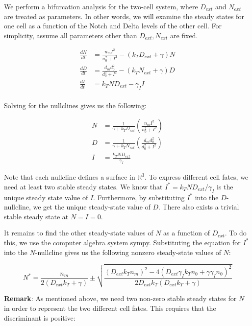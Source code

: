 \documentclass{article}
\begin{document}
\begin{flushleft}
We perform a bifurcation analysis for the two-cell system, where $D_{ext}$ and $N_{ext}$ are treated as parameters. In other words, we will examine the steady states for one cell as a function of the Notch and Delta levels of the other cell. For simplicity, assume all parameters other than $D_{ext}, N_{ext}$ are fixed.

$$
\begin{aligned}
  \frac{dN}{dt} &= \frac{n_{m}I^2}{n_{0}^2 + I^2} - (k_{T}D_{ext} + \gamma)N \\[5pt]
  \frac{dD}{dt} &= \frac{d_{m}d_{0}^2}{d_{0}^2 + I^2} - (k_{T}N_{ext} + \gamma)D \\[5pt]
  \frac{dI}{dt} &= k_{T}ND_{ext} - \gamma_{I}I \\[5pt]
\end{aligned}
$$

Solving for the nullclines gives us the following:

$$
\begin{aligned}
  N &= \frac{1}{\gamma + k_{T}D_{ext}}\left(\frac{n_{m}I^2}{n_{0}^2 + I^2}\right) \\[5pt]
  D &= \frac{1}{\gamma + k_{T}N_{ext}}\left( \frac{d_{m}d_{0}^2}{d_{0}^2 + I^2} \right) \\[5pt]
  I &= \frac{k_{T}ND_{ext}}{\gamma_{I}}
\end{aligned}
$$

Note that each nullcline defines a surface in $\mathbb{R}^3$. To express different cell fates, we need at least two stable steady states. We know that $I^{*} = k_{T}ND_{ext} / \gamma_{I}$ is the unique steady state value of $I$. Furthermore, by substituting $I^{*}$ into the $D$-nullcline, we get the unique steady-state value of $D$. There also exists a trivial stable steady state at $N = I = 0$. 

\medskip

It remains to find the other steady-state values of $N$ as a function of $D_{ext}$. To do this, we use the computer algebra system sympy. Substituting the equation for $I^{*}$ into the $N$-nullcline gives us the following nonzero steady-state values of $N$:

\medskip

$$
N^{*} = \frac{n_{m}}{2(D_{ext}k_{T} + \gamma)} \pm \sqrt{\frac{(D_{ext}k_{T}n_{m})^2 - 4(D_{ext}\gamma_{I}k_{T}n_{0} + \gamma \gamma_{I}n_{0})^2}{2D_{ext}k_{T}(D_{ext}k_{T} + \gamma)}}
$$

\textbf{Remark}: As mentioned above, we need two non-zero stable steady states for $N$ in order to represent the two different cell fates. This requires that the discriminant is positive:


\end{flushleft}
\end{document}
